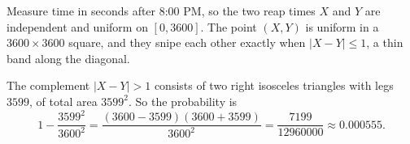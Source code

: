 Measure time in seconds after 8:00 PM, so the two reap times $X$ and $Y$ are independent and uniform on $[0,3600]$. The point $(X,Y)$ is uniform in a $3600\times3600$ square, and they snipe each other exactly when $|X-Y|\le1$, a thin band along the diagonal.

The complement $|X-Y|>1$ consists of two right isosceles triangles with legs $3599$, of total area $3599^2$. So the probability is
\[1-\dfrac{3599^2}{3600^2}=\dfrac{(3600-3599)(3600+3599)}{3600^2}=\boxed{\dfrac{7199}{12960000}}\approx0.000555.\]

